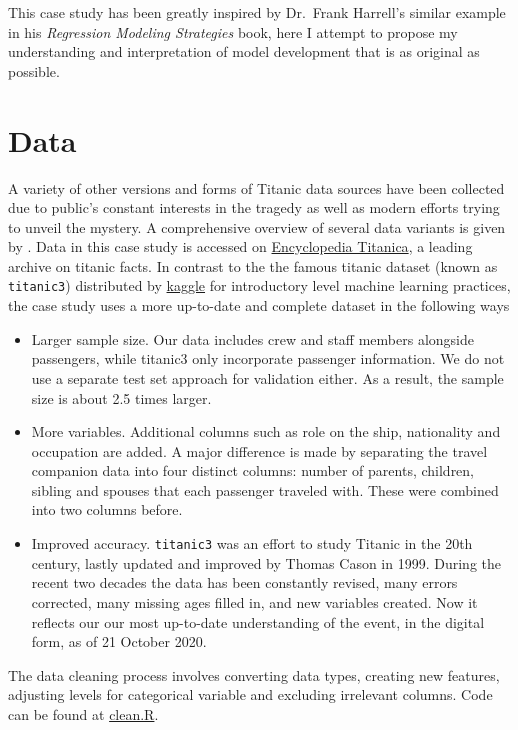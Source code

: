 \documentclass[]{interact}
\theoremstyle{plain}%
\theoremstyle{definition}
\theoremstyle{remark}
\begin{document}
This case study has been greatly inspired by Dr.~Frank Harrell's similar example in his \emph{Regression Modeling Strategies} \citeyearpar[ Chapter 12]{harrell2015regression} book, here I attempt to propose my understanding and interpretation of model development that is as original as possible.

\hypertarget{data}{%
\section{Data}\label{data}}

A variety of other versions and forms of Titanic data sources have been collected due to public's constant interests in the tragedy as well as modern efforts trying to unveil the mystery. A comprehensive overview of several data variants is given by \citet{symanzikunsinkable}. Data in this case study is accessed on \href{https://www.encyclopedia-titanica.org/}{Encyclopedia Titanica}, a leading archive on titanic facts. In contrast to the the famous titanic dataset (known as \texttt{titanic3}) distributed by \href{kaggle.com}{kaggle} for introductory level machine learning practices, the case study uses a more up-to-date and complete dataset in the following ways

\begin{itemize}
\item
  Larger sample size. Our data includes crew and staff members alongside passengers, while titanic3 only incorporate passenger information. We do not use a separate test set approach for validation either. As a result, the sample size is about 2.5 times larger.
\item
  More variables. Additional columns such as role on the ship, nationality and occupation are added. A major difference is made by separating the travel companion data into four distinct columns: number of parents, children, sibling and spouses that each passenger traveled with. These were combined into two columns before.
\item
  Improved accuracy. \texttt{titanic3} was an effort to study Titanic in the 20th century, lastly updated and improved by Thomas Cason in 1999. During the recent two decades the data has been constantly revised, many errors corrected, many missing ages filled in, and new variables created. Now it reflects our our most up-to-date understanding of the event, in the digital form, as of 21 October 2020.
\end{itemize}

The data cleaning process involves converting data types, creating new features, adjusting levels for categorical variable and excluding irrelevant columns. Code can be found at \href{https://github.com/enixam/titanic-survival/blob/master/clean.R}{clean.R}.
\end{document}
